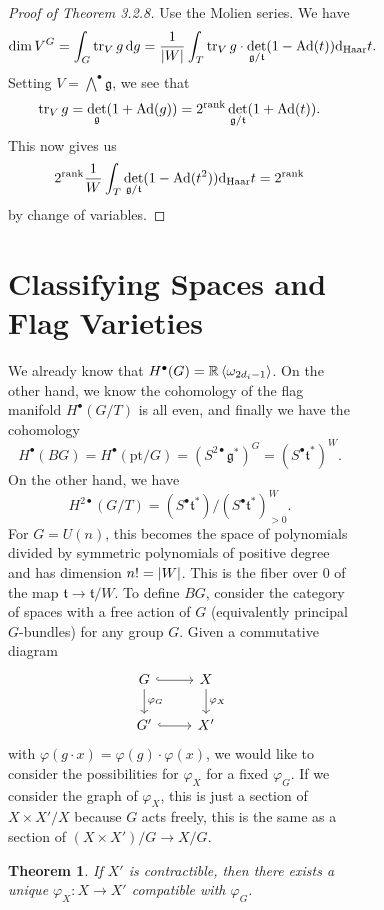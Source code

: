 \documentclass[leqno, openany]{memoir}
\newtheorem{thm}{Theorem}[section]
\theoremstyle{definition}
\theoremstyle{remark}
\theoremstyle{plain}
\theoremstyle{definition}
\theoremstyle{remark}
\newcommand{\R}{\mathbb{R}}
\newcommand{\mf}[1]{\mathfrak{#1}}
\newcommand{\mr}[1]{\mathrm{#1}}
\DeclareMathOperator{\Ad}{Ad}
\begin{document}
\begin{figure}[H]
\begin{figure}[H]
\begin{proof}[Proof of Theorem 3.2.8] Use the Molien series. We have \[ \dim
V^G = \int_G \tr_V g \dd{g} = \frac{1}{\abs{W}} \int_T \tr_V g \cdot
\det_{\mf{g}/\mf{t}} (1 - \Ad(t)) \dd_{\mr{Haar}} t. \] Setting $V =
\bigwedge^{\bullet} \mf{g}$, we see that \[ \tr_V g = \det_{\mf{g}} (1 +
    \Ad(g)) = 2^{\rank} \det_{\mf{g}/\mf{t}} (1 + \Ad(t)). \] This now gives us
    \[ 2^{\rank} \frac{1}{W} \int_T \det_{\mf{g}/\mf{t}} (1 - \Ad(t^2))
    \dd_{\mr{Haar}} t = 2^{\rank} \] by change of variables.  \end{proof}

\section{Classifying Spaces and Flag Varieties}%
\label{sec:classifying_spaces_and_flag_varieties}

We already know that $H^{\bullet}(G) = \R \ev{\omega_{2d_i - 1}}$. On the other
hand, we know the cohomology of the flag manifold $H^{\bullet}(G/T)$ is all
even, and finally we have the cohomology \[ H^{\bullet}(BG) =
H^{\bullet}(\mr{pt} /G) = {(S^{2\bullet} \mf{g}^*)}^G = {(S^{\bullet}
\mf{t}^*)}^W. \] On the other hand, we have \[ H^{2\bullet}(G/T) =
{(S^{\bullet} \mf{t}^*)} / {(S^{\bullet} \mf{t}^*)}^W_{>0}. \] For $G = U(n)$,
this becomes the space of polynomials divided by symmetric polynomials of
positive degree and has dimension $n! = \abs{W}$. This is the fiber over $0$ of
the map $\mf{t} \to \mf{t} / W$. To define $BG$, consider the category of
spaces with a free action of $G$ (equivalently principal $G$-bundles) for any
group $G$. Given a commutative diagram \begin{equation*} \begin{tikzcd} G
\ar[hookrightarrow]{r} \ar{d}{\varphi_G} & X \ar{d}{\varphi_X} \\ G'
\ar[hookrightarrow]{r} & X' \end{tikzcd} \end{equation*} with $\varphi(g \cdot
x) = \varphi(g) \cdot \varphi(x)$, we would like to consider the possibilities
for $\varphi_X$ for a fixed $\varphi_G$. If we consider the graph of
$\varphi_X$, this is just a section of $X \times X' / X$ because $G$ acts
freely, this is the same as a section of $(X \times X')/G \to X/G$.

\begin{thm} If $X'$ is contractible, then there exists a unique $\varphi_X
\colon X \to X'$ compatible with $\varphi_G$.  \end{thm}


\end{figure}
\end{figure}
\end{document}
